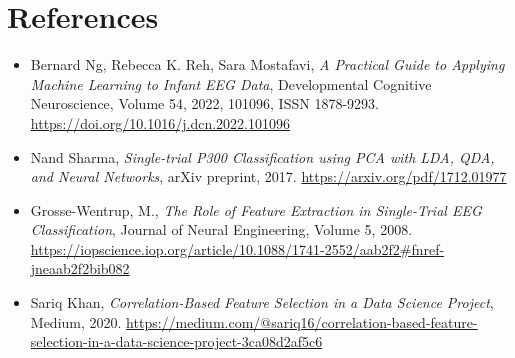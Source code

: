 \documentclass{article}
\begin{document}
\section{References}
\begin{itemize}
    \item Bernard Ng, Rebecca K. Reh, Sara Mostafavi, \emph{A Practical Guide to Applying Machine Learning to Infant EEG Data}, Developmental Cognitive Neuroscience, Volume 54, 2022, 101096, ISSN 1878-9293. \href{https://doi.org/10.1016/j.dcn.2022.101096}{https://doi.org/10.1016/j.dcn.2022.101096}
\item Nand Sharma, \emph{Single-trial P300 Classification using PCA with LDA, QDA, and Neural Networks}, arXiv preprint, 2017. \href{https://arxiv.org/pdf/1712.01977}{https://arxiv.org/pdf/1712.01977}
 \item Grosse-Wentrup, M., \emph{The Role of Feature Extraction in Single-Trial EEG Classification}, Journal of Neural Engineering, Volume 5, 2008. \href{https://iopscience.iop.org/article/10.1088/1741-2552/aab2f2\#fnref-jneaab2f2bib082}{https://iopscience.iop.org/article/10.1088/1741-2552/aab2f2\#fnref-jneaab2f2bib082}
 \item Sariq Khan, \emph{Correlation-Based Feature Selection in a Data Science Project}, Medium, 2020. \href{https://medium.com/@sariq16/correlation-based-feature-selection-in-a-data-science-project-3ca08d2af5c6}{https://medium.com/@sariq16/correlation-based-feature-selection-in-a-data-science-project-3ca08d2af5c6}

\end{itemize}
\end{document}
